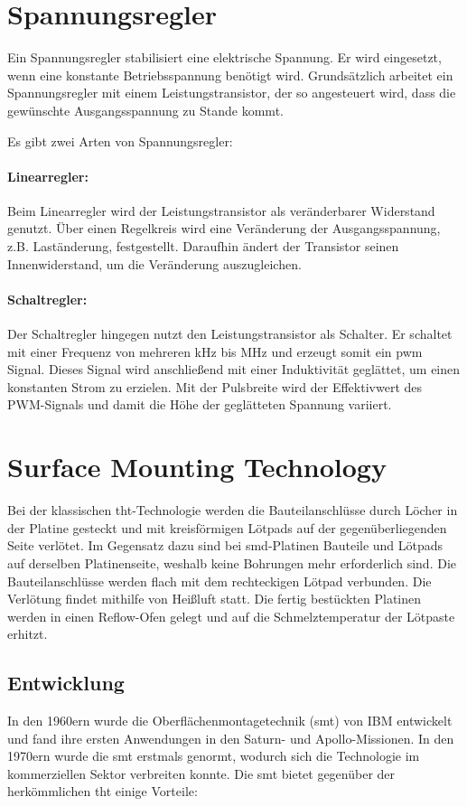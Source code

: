 \section{Spannungsregler}
Ein Spannungsregler stabilisiert eine elektrische Spannung.
Er wird eingesetzt, wenn eine konstante Betriebsspannung benötigt wird.
Grundsätzlich arbeitet ein Spannungsregler mit einem Leistungstransistor, der so angesteuert wird, dass die gewünschte Ausgangsspannung zu Stande kommt.\par

Es gibt zwei Arten von Spannungsregler:
\paragraph{Linearregler:}
Beim Linearregler wird der Leistungstransistor als veränderbarer Widerstand genutzt.
Über einen Regelkreis wird eine Veränderung der Ausgangsspannung, z.B. Laständerung, festgestellt.
Daraufhin ändert der Transistor seinen Innenwiderstand, um die Veränderung auszugleichen.\par

\paragraph{Schaltregler:}
Der Schaltregler hingegen nutzt den Leistungstransistor als Schalter.
Er schaltet mit einer Frequenz von mehreren kHz bis MHz und erzeugt somit ein \ac{pwm} Signal.
Dieses Signal wird anschließend mit einer Induktivität geglättet, um einen konstanten Strom zu erzielen.
Mit der Pulsbreite wird der Effektivwert des PWM-Signals und damit die Höhe der geglätteten Spannung variiert.\par

\section{Surface Mounting Technology}
Bei der klassischen \ac{tht}-Technologie werden die Bauteilanschlüsse durch Löcher in der Platine gesteckt und mit kreisförmigen Lötpads auf der gegenüberliegenden Seite verlötet.
Im Gegensatz dazu sind bei \ac{smd}-Platinen Bauteile und Lötpads auf derselben Platinenseite, weshalb keine Bohrungen mehr erforderlich sind.
Die Bauteilanschlüsse werden flach mit dem rechteckigen Lötpad verbunden.
Die Verlötung findet mithilfe von Heißluft statt.
Die fertig bestückten Platinen werden in einen Reflow-Ofen gelegt und auf die Schmelztemperatur der Lötpaste erhitzt.

\subsection{Entwicklung}
In den 1960ern wurde die Oberflächenmontagetechnik (\ac{smt}) von IBM entwickelt und fand ihre ersten Anwendungen in den Saturn- und Apollo-Missionen.
In den 1970ern wurde die \ac{smt} erstmals genormt, wodurch sich die Technologie im kommerziellen Sektor verbreiten konnte.
Die \ac{smt} bietet gegenüber der herkömmlichen \ac{tht} einige Vorteile:
